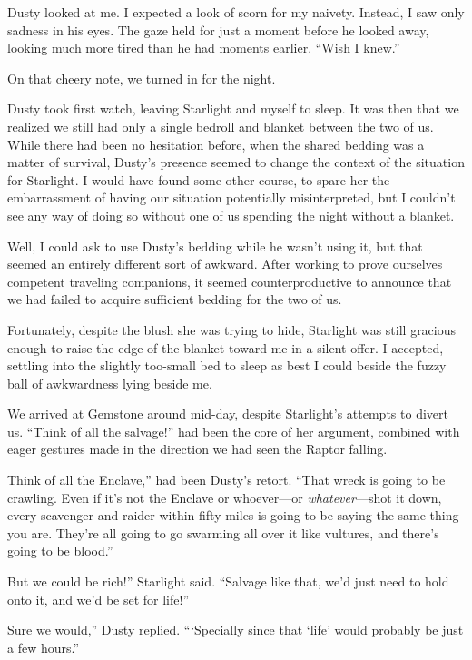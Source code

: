 Dusty looked at me. I expected a look of scorn for my naivety. Instead, I saw only sadness in his eyes. The gaze held for just a moment before he looked away, looking much more tired than he had moments earlier. “Wish I knew.”

On that cheery note, we turned in for the night.

Dusty took first watch, leaving Starlight and myself to sleep. It was then that we realized we still had only a single bedroll and blanket between the two of us. While there had been no hesitation before, when the shared bedding was a matter of survival, Dusty’s presence seemed to change the context of the situation for Starlight. I would have found some other course, to spare her the embarrassment of having our situation potentially misinterpreted, but I couldn’t see any way of doing so without one of us spending the night without a blanket.

Well, I could ask to use Dusty’s bedding while he wasn’t using it, but that seemed an entirely different sort of awkward. After working to prove ourselves competent traveling companions, it seemed counterproductive to announce that we had failed to acquire sufficient bedding for the two of us.

Fortunately, despite the blush she was trying to hide, Starlight was still gracious enough to raise the edge of the blanket toward me in a silent offer. I accepted, settling into the slightly too-small bed to sleep as best I could beside the fuzzy ball of awkwardness lying beside me.

{\br}%
We arrived at Gemstone around mid-day, despite Starlight’s attempts to divert us. “Think of all the salvage!” had been the core of her argument, combined with eager gestures made in the direction we had seen the Raptor falling.

\leavevmode{}Think of all the Enclave,” had been Dusty’s retort. “That wreck is going to be crawling. Even if it’s not the Enclave or whoever—or \textit{whatever}—shot it down, every scavenger and raider within fifty miles is going to be saying the same thing you are. They’re all going to go swarming all over it like vultures, and there’s going to be blood.”

\leavevmode{}But we could be rich!” Starlight said. “Salvage like that, we’d just need to hold onto it, and we’d be set for life!”

\leavevmode{}Sure we would,” Dusty replied. “‘Specially since that ‘life’ would probably be just a few hours.”

